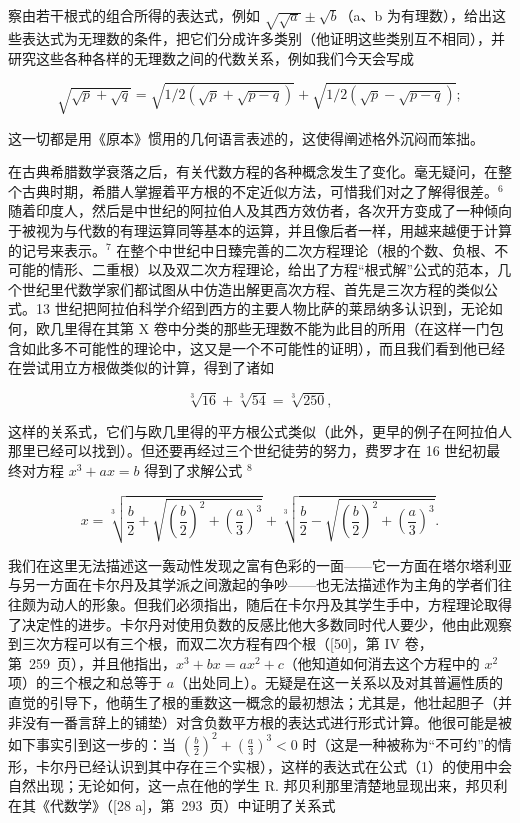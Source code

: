 察由若干根式的组合所得的表达式，例如 \(\sqrt{\sqrt{a}} \pm \sqrt{b}\)（a、b 为有理数），给出这些表达式为无理数的条件，把它们分成许多类别（他证明这些类别互不相同），并研究这些各种各样的无理数之间的代数关系，例如我们今天会写成

\[
\sqrt {\sqrt {p} + \sqrt {q}} = \sqrt {1 / 2 (\sqrt {p} + \sqrt {p - q})} + \sqrt {1 / 2 (\sqrt {p} - \sqrt {p - q})};
\]

这一切都是用《原本》惯用的几何语言表述的，这使得阐述格外沉闷而笨拙。

在古典希腊数学衰落之后，有关代数方程的各种概念发生了变化。毫无疑问，在整个古典时期，希腊人掌握着平方根的不定近似方法，可惜我们对之了解得很差。\(^{6}\) 随着印度人，然后是中世纪的阿拉伯人及其西方效仿者，各次开方变成了一种倾向于被视为与代数的有理运算同等基本的运算，并且像后者一样，用越来越便于计算的记号来表示。\(^{7}\) 在整个中世纪中日臻完善的二次方程理论（根的个数、负根、不可能的情形、二重根）以及双二次方程理论，给出了方程“根式解”公式的范本，几个世纪里代数学家们都试图从中仿造出解更高次方程、首先是三次方程的类似公式。13 世纪把阿拉伯科学介绍到西方的主要人物比萨的莱昂纳多认识到，无论如何，欧几里得在其第 X 卷中分类的那些无理数不能为此目的所用（在这样一门包含如此多不可能性的理论中，这又是一个不可能性的证明），而且我们看到他已经在尝试用立方根做类似的计算，得到了诸如

\[
\sqrt [ 3 ]{16} + \sqrt [ 3 ]{54} = \sqrt [ 3 ]{250},
\]

这样的关系式，它们与欧几里得的平方根公式类似（此外，更早的例子在阿拉伯人那里已经可以找到）。但还要再经过三个世纪徒劳的努力，费罗才在 16 世纪初最终对方程 \(x^{3} + ax = b\) 得到了求解公式 \(^{8}\)

\[
x = \sqrt [ 3 ]{\frac {b}{2} + \sqrt {\left(\frac {b}{2}\right) ^ {2} + \left(\frac {a}{3}\right) ^ {3}}} + \sqrt [ 3 ]{\frac {b}{2} - \sqrt {\left(\frac {b}{2}\right) ^ {2} + \left(\frac {a}{3}\right) ^ {3}}}.\tag{5.1}
\]

我们在这里无法描述这一轰动性发现之富有色彩的一面——它一方面在塔尔塔利亚与另一方面在卡尔丹及其学派之间激起的争吵——也无法描述作为主角的学者们往往颇为动人的形象。但我们必须指出，随后在卡尔丹及其学生手中，方程理论取得了决定性的进步。卡尔丹对使用负数的反感比他大多数同时代人要少，他由此观察到三次方程可以有三个根，而双二次方程有四个根（{[}50{]}，第 IV 卷，第~259~页），并且他指出，\(x^3 + bx = ax^2 + c\)（他知道如何消去这个方程中的 \(x^2\) 项）的三个根之和总等于 \(a\)（出处同上）。无疑是在这一关系以及对其普遍性质的直觉的引导下，他萌生了根的重数这一概念的最初想法；尤其是，他壮起胆子（并非没有一番言辞上的铺垫）对含负数平方根的表达式进行形式计算。他很可能是被如下事实引到这一步的：当 \(\left(\frac{b}{2}\right)^{2}+\left(\frac{a}{3}\right)^{3}<0\) 时（这是一种被称为“不可约”的情形，卡尔丹已经认识到其中存在三个实根），这样的表达式在公式（1）的使用中会自然出现；无论如何，这一点在他的学生 R. 邦贝利那里清楚地显现出来，邦贝利在其《代数学》（{[}28 a{]}，第~293~页）中证明了关系式

